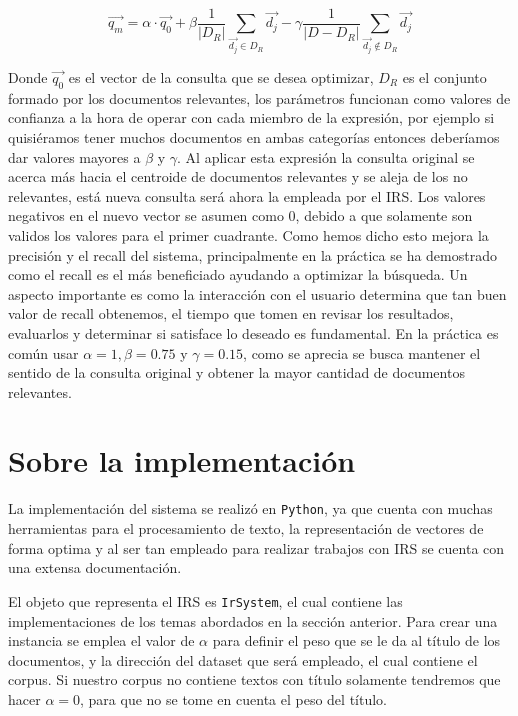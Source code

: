 \documentclass[runningheads,a4paper]{llncs}
\begin{document}
\begin{equation}
	\overrightarrow{q_m} = \alpha · \overrightarrow{q_0} + \beta \frac{1}{|D_R|} \sum_{\overrightarrow{d_j} \in D_R} \overrightarrow{d_j} - \gamma \frac{1}{|D - D_R|} \sum_{\overrightarrow{d_j} \notin D_R} \overrightarrow{d_j}
\end{equation}

Donde $\overrightarrow{q_0}$ es el vector de la consulta que se desea optimizar, $D_R$ es el conjunto formado por los documentos relevantes, los parámetros funcionan como valores de confianza a la hora de operar con cada miembro de la expresión, por ejemplo si quisiéramos tener muchos documentos en ambas categorías entonces deberíamos dar valores mayores a $\beta$ y $\gamma$. Al aplicar esta expresión la consulta original se acerca más hacia el centroide de documentos relevantes y se aleja de los no relevantes, está nueva consulta será ahora la empleada por el IRS. Los valores negativos en el nuevo vector se asumen como 0, debido a que solamente son validos los valores para el primer cuadrante. Como hemos dicho esto mejora la precisión y el recall del sistema, principalmente en la práctica se ha demostrado como el recall es el más beneficiado ayudando a optimizar la búsqueda. Un aspecto importante es como la interacción con el usuario determina que tan buen valor de recall obtenemos, el tiempo que tomen en revisar los resultados, evaluarlos y determinar si satisface lo deseado es fundamental. En la práctica es común usar $\alpha = 1, \beta = 0.75$ y $\gamma = 0.15$, como se aprecia se busca mantener el sentido de la consulta original y obtener la mayor cantidad de documentos relevantes.

\section{Sobre la implementación} %

La implementación del sistema se realizó en \verb*|Python|, ya que cuenta con muchas herramientas para el procesamiento de texto, la representación de vectores de forma optima y al ser tan empleado para realizar trabajos con IRS se cuenta con una extensa documentación.

El objeto que representa el IRS es \verb*|IrSystem|, el cual contiene las implementaciones de los temas abordados en la sección anterior. Para crear una instancia se emplea el valor de $\alpha$ para definir el peso que se le da al título de los documentos, y la dirección del dataset que será empleado, el cual contiene el corpus. Si nuestro corpus no contiene textos con título solamente tendremos que hacer $\alpha = 0$, para que no se tome en cuenta el peso del título.
\end{document}
